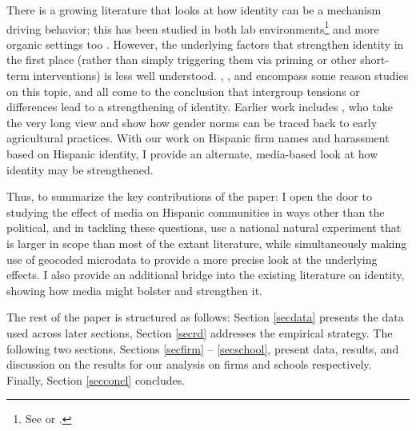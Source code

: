 \documentclass[11pt]{article}
\begin{document}
There is a growing literature that looks at how identity can be a mechanism driving behavior; this has been studied in both lab environments\footnote{ See \cite{benjamin_social_2007} or \cite{benjamin_religious_2010}.} and more organic settings too \citep{bursztyn_moral_2015}. However, the underlying factors that strengthen identity in the first place (rather than simply triggering them via priming or other short-term interventions) is less well understood.  \cite{bisin_bend_2010}, \cite{atkin_how_2019}, and \cite{bazzi_unity_2019} encompass some reason studies on this topic, and all come to the conclusion that intergroup tensions or differences lead to a strengthening of identity. Earlier work includes \cite{@CITE ALESINA}, who take the very long view and show how gender norms can be traced back to early agricultural practices. With our work on Hispanic firm names and harassment based on Hispanic identity, I provide an alternate, media-based look at how identity may be strengthened. 

Thus, to summarize the key contributions of the paper: I open the door to studying the effect of media on Hispanic communities in ways other than the political, and in tackling these questions, use a national natural experiment that is larger in scope than most of the extant literature, while simultaneously making use of geocoded microdata to provide a more precise look at the underlying effects. I also provide an additional bridge into the existing literature on identity, showing how media might bolster and strengthen it.





The rest of the paper is structured as follows: Section \ref{secdata} presents the data used across later sections, Section \ref{secrd} addresses the empirical strategy. The following two sections, Sections \ref{secfirm} -- \ref{secschool}, present data, results, and discussion on the results for our analysis on firms and schools respectively. Finally, Section \ref{secconcl} concludes.
\end{document}
